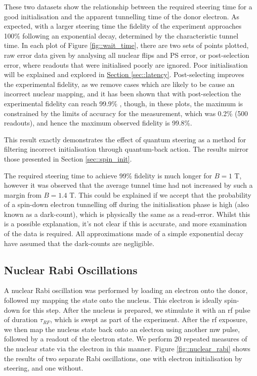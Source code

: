 	These two datasets show the relationship between the required steering time for a good initialisation and the apparent tunnelling time of the donor electron. As expected, with a larger steering time the fidelity of the experiment approaches 100\% following an exponential decay, determined by the characteristic tunnel time. In each plot of Figure \ref{fig::wait_time}, there are two sets of points plotted, raw error data given by analysing all nuclear flips and PS error, or post-selection error, where readouts that were initialised poorly are ignored. Poor initialisation will be explained and explored in \hyperref[sec::latency]{Section \ref{sec::latency}}. Post-selecting improves the experimental fidelity, as we remove cases which are likely to be cause an incorrect nuclear mapping, and it has been shown that with post-selection the experimental fidelity can reach 99.9\% , though, in these plots, the maximum is constrained by the limits of accuracy for the measurement, which was 0.2\% (500 readouts), and hence the maximum observed fidelity is 99.8\%.

	This result exactly demonstrates the effect of quantum steering as a method for filtering incorrect initialisation through quantum-back action. The results mirror those presented in Section \ref{sec::spin_init}.
	
	The required steering time to achieve 99\% fidelity is much longer for $B = 1$ T, however it was observed that the average tunnel time had not increased by such a margin from $B = 1.4$ T. This could be explained if we accept that the probability of a spin-down electron tunnelling off during the initialisation phase is high (also known as a dark-count), which is physically the same as a read-error. Whilst this is a possible explanation, it's not clear if this is accurate, and more examination of the data is required. All approximations made of a simple exponential decay have assumed that the dark-counts are negligible.

\subsection{Nuclear Rabi Oscillations}
	A nuclear Rabi oscillation was performed by loading an electron onto the donor, followed my mapping the state onto the nucleus. This electron is ideally spin-down for this step. After the nucleus is prepared, we stimulate it with an \gls{rf} pulse of duration $\tau_{RF}$, which is swept as part of the experiment. After the \gls{rf} exposure, we then map the nucleus state back onto an electron using another \gls{mw} pulse, followed by a readout of the electron state. We perform 20 repeated measures of the nuclear state via the electron in this manner. 	Figure \ref{fig::nuclear_rabi} shows the results of two separate Rabi oscillations, one with electron initialisation by steering, and one without.
	
